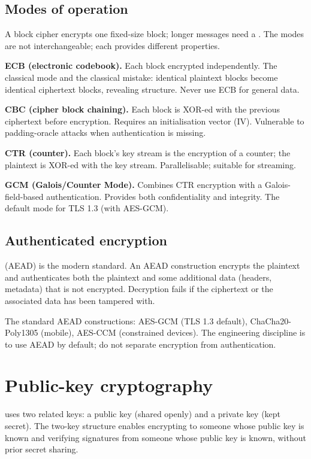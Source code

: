 \subsection{Modes of operation}

A block cipher encrypts one fixed-size block; longer messages need a . The modes are not interchangeable; each provides different properties.

\textbf{ECB (electronic codebook).} Each block encrypted independently. The classical mode and the classical mistake: identical plaintext blocks become identical ciphertext blocks, revealing structure. Never use ECB for general data.

\textbf{CBC (cipher block chaining).} Each block is XOR-ed with the previous ciphertext before encryption. Requires an initialisation vector (IV). Vulnerable to padding-oracle attacks when authentication is missing.

\textbf{CTR (counter).} Each block's key stream is the encryption of a counter; the plaintext is XOR-ed with the key stream. Parallelisable; suitable for streaming.

\textbf{GCM (Galois/Counter Mode).} Combines CTR encryption with a Galois-field-based authentication. Provides both confidentiality and integrity. The default mode for TLS 1.3 (with AES-GCM).

\subsection{Authenticated encryption}

 (AEAD) is the modern standard. An AEAD construction encrypts the plaintext and authenticates both the plaintext and some additional data (headers, metadata) that is not encrypted. Decryption fails if the ciphertext or the associated data has been tampered with.

The standard AEAD constructions: AES-GCM (TLS 1.3 default), ChaCha20-Poly1305 (mobile), AES-CCM (constrained devices). The engineering discipline is to use AEAD by default; do not separate encryption from authentication.

\section{Public-key cryptography}

 uses two related keys: a public key (shared openly) and a private key (kept secret). The two-key structure enables encrypting to someone whose public key is known and verifying signatures from someone whose public key is known, without prior secret sharing.

